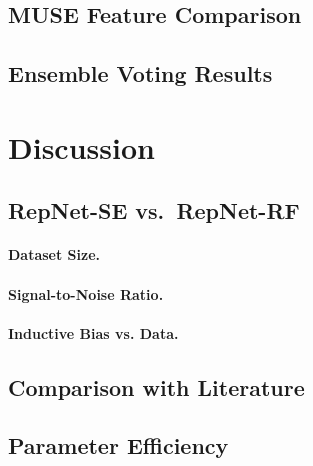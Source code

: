 \documentclass[sigconf,nonacm]{acmart}
\begin{document}
\subsection{MUSE Feature Comparison}

\subsection{Ensemble Voting Results}


\section{Discussion}
\label{sec:discussion}

\subsection{RepNet-SE vs.\ RepNet-RF}

\paragraph{Dataset Size.}

\paragraph{Signal-to-Noise Ratio.}

\paragraph{Inductive Bias vs. Data.}

\subsection{Comparison with Literature}

\subsection{Parameter Efficiency}
\end{document}
